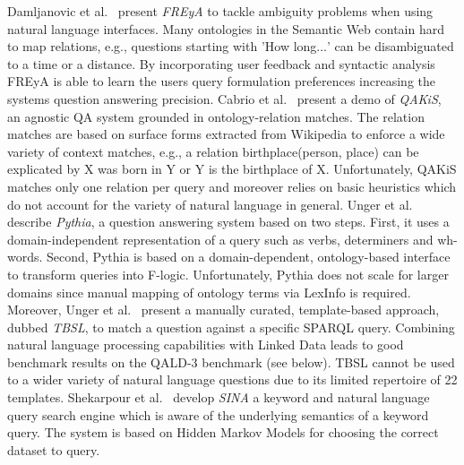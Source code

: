 {Damljanovic et al.~\cite{freya}} present \emph{FREyA} to tackle ambiguity problems when using natural language interfaces. 
Many ontologies in the Semantic Web contain hard to map relations, e.g., questions starting with 'How long$\ldots$' can be disambiguated to a time or a distance. 
By incorporating user feedback and syntactic analysis FREyA is able to learn the users query formulation preferences increasing the systems question answering precision. 
{Cabrio et al.~\cite{qakis}} present a demo of \emph{QAKiS}, an agnostic QA system grounded in ontology-relation matches. 
The relation matches are based on surface forms extracted from Wikipedia to enforce a wide variety of context matches, e.g., a relation birthplace(person, place) can be explicated by X was born in Y or Y is the birthplace of X. 
Unfortunately, QAKiS matches only one relation per query and moreover relies on basic heuristics which do not account for the variety of natural language in general.
{Unger et al.~\cite{pythia}} describe \emph{Pythia}, a question answering system based on two steps.
First, it uses a domain-independent representation of a query such as verbs, determiners and wh-words.
Second, Pythia is based on a domain-dependent, ontology-based interface to transform queries into F-logic.
Unfortunately, Pythia does not scale for larger domains since manual mapping of ontology terms via LexInfo is required.
Moreover, Unger et al.~\cite{tbsl} present a manually curated, template-based approach, dubbed \emph{TBSL}, to match a question against a specific SPARQL query. 
Combining natural language processing capabilities with Linked Data leads to good benchmark results on the QALD-3 benchmark (see below).
TBSL cannot be used to a wider variety of natural language questions due to its limited repertoire of 22 templates.
{Shekarpour et al.~\cite{SINA_WebSemantic}} develop \emph{SINA} a keyword and natural language query search engine which is aware of the underlying semantics of a keyword query. 
The system is based on Hidden Markov Models for choosing the correct dataset to query.
